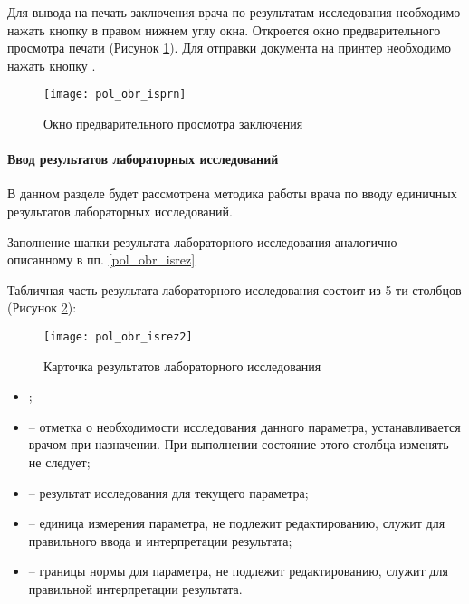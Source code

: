 

Для вывода на печать заключения врача по результатам исследования необходимо нажать кнопку  в правом нижнем углу окна. Откроется окно предварительного просмотра печати (Рисунок \ref{img_pol_obr_isprn}). Для отправки документа на принтер необходимо нажать кнопку .

 \begin{figure}[ht]\centering
   \texttt{[image: pol\_obr\_isprn]}
   \caption{Окно предварительного просмотра заключения}
   \label{img_pol_obr_isprn}
 \end{figure}

\paragraph{Ввод результатов лабораторных исследований} \label{pol_obr_rez}
 
В данном разделе будет рассмотрена методика работы врача по вводу единичных результатов лабораторных исследований.

Заполнение шапки результата лабораторного исследования аналогично описанному в пп. \ref{pol_obr_isrez}

Табличная часть результата лабораторного исследования состоит из 5-ти столбцов (Рисунок \ref{img_pol_obr_isrez2}):

 \begin{figure}[ht]\centering
   \texttt{[image: pol\_obr\_isrez2]}
   \caption{Карточка результатов лабораторного исследования}
   \label{img_pol_obr_isrez2}
 \end{figure}
 
\begin{itemize}
 \item {};
 \item {} – отметка о необходимости исследования данного параметра, устанавливается врачом при назначении. При выполнении состояние этого столбца изменять не следует;
 \item {} – результат исследования для текущего параметра;
 \item {} – единица измерения параметра, не подлежит редактированию, служит для правильного ввода и интерпретации результата;
 \item {} – границы нормы для параметра, не подлежит редактированию, служит для правильной интерпретации результата.
\end{itemize}

